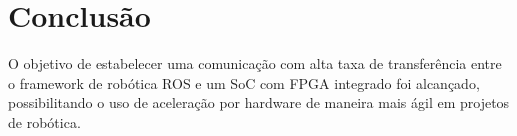 \chapter{Conclusão}\label{cap:conclusao}

O objetivo de estabelecer uma comunicação com alta taxa de transferência entre o framework de robótica ROS e um SoC com FPGA integrado foi alcançado, possibilitando o uso de aceleração por hardware de maneira mais ágil em projetos de robótica.